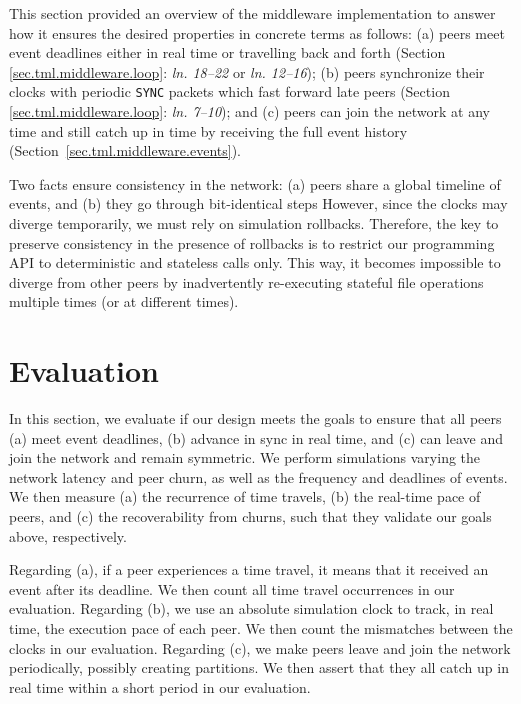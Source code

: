 \documentclass[10pt,journal,compsoc]{IEEEtran}
\newcommand{\code}[1]  {\texttt{\small{#1}}}
\newcommand{\linx}[1]{\emph{ln. #1}\xspace}
\begin{document}
This section provided an overview of the middleware implementation to answer
how it ensures the desired properties in concrete terms as follows:
    (a) peers meet event deadlines either in real time or travelling back and
        forth (Section \ref{sec.tml.middleware.loop}: \linx{18--22} or
        \linx{12--16});
    (b) peers synchronize their clocks with periodic \code{SYNC} packets which
        fast forward late peers (Section \ref{sec.tml.middleware.loop}:
        \linx{7--10}); and
    (c) peers can join the network at any time and still catch up in time by
        receiving the full event history
        (Section~\ref{sec.tml.middleware.events}).

Two facts ensure consistency in the network:
    (a) peers share a global timeline of events, and
    (b) they go through bit-identical steps
%
However, since the clocks may diverge temporarily, we must rely on simulation
rollbacks.
Therefore, the key to preserve consistency in the presence of rollbacks is to
restrict our programming API to deterministic and stateless calls only.
This way, it becomes impossible to diverge from other peers by inadvertently
re-executing stateful file operations multiple times (or at different times).

\section{Evaluation}
\label{sec.eval}

In this section, we evaluate if our design meets the goals to ensure that all
peers
    (a) meet event deadlines,
    (b) advance in sync in real time, and
    (c) can leave and join the network and remain symmetric.
%
We perform simulations varying the network latency and peer churn, as well as
the frequency and deadlines of events.
%
We then measure
    (a) the recurrence of time travels,
    (b) the real-time pace of peers, and
    (c) the recoverability from churns,
such that they validate our goals above, respectively.

Regarding (a), if a peer experiences a time travel, it means that it received
an event after its deadline.
We then count all time travel occurrences in our evaluation.
%
Regarding (b), we use an absolute simulation clock to track, in real time, the
execution pace of each peer.
We then count the mismatches between the clocks in our evaluation.
%
Regarding (c), we make peers leave and join the network periodically, possibly
creating partitions.
We then assert that they all catch up in real time within a short period in our
evaluation.
\end{document}
